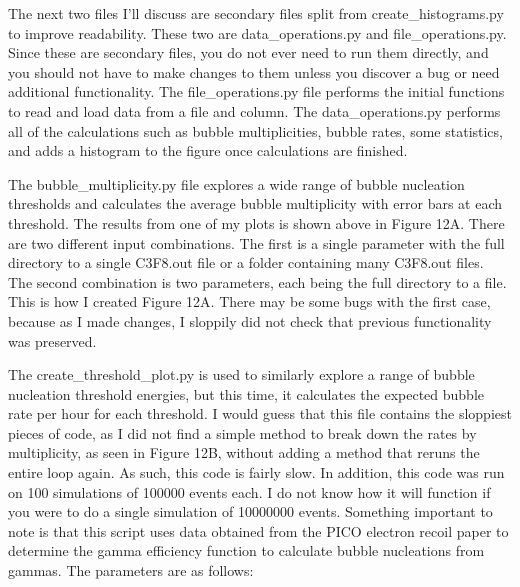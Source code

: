 \documentclass[%
12pt,
twoside,
reprint,
amsmath,amssymb,
aps,
]{article}
\begin{document}
	\par The next two files I'll discuss are secondary files split from create\_histograms.py to improve readability. These two are data\_operations.py and file\_operations.py. Since these are secondary files, you do not ever need to run them directly, and you should not have to make changes to them unless you discover a bug or need additional functionality. The file\_operations.py file performs the initial functions to read and load data from a file and column. The data\_operations.py performs all of the calculations such as bubble multiplicities, bubble rates, some statistics, and adds a histogram to the figure once calculations are finished.
	\par The bubble\_multiplicity.py file explores a wide range of bubble nucleation thresholds and calculates the average bubble multiplicity with error bars at each threshold. The results from one of my plots is shown above in Figure 12A. There are two different input combinations. The first is a single parameter with the full directory to a single C3F8.out file or a folder containing many C3F8.out files. The second combination is two parameters, each being the full directory to a file. This is how I created Figure 12A. There may be some bugs with the first case, because as I made changes, I sloppily did not check that previous functionality was preserved.
	\par The create\_threshold\_plot.py is used to similarly explore a range of bubble nucleation threshold energies, but this time, it calculates the expected bubble rate per hour for each threshold. I would guess that this file contains the sloppiest pieces of code, as I did not find a simple method to break down the rates by multiplicity, as seen in Figure 12B, without adding a method that reruns the entire loop again. As such, this code is fairly slow. In addition, this code was run on 100 simulations of 100000 events each. I do not know how it will function if you were to do a single simulation of 10000000 events. Something important to note is that this script uses data obtained from the PICO electron recoil paper to determine the gamma efficiency function to calculate bubble nucleations from gammas. The parameters are as follows:
	
\end{document}
